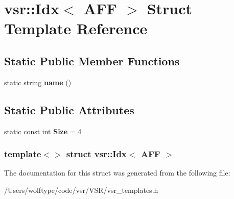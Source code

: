 \hypertarget{structvsr_1_1_idx_3_01_a_f_f_01_4}{\section{vsr\-:\-:Idx$<$ A\-F\-F $>$ Struct Template Reference}
\label{structvsr_1_1_idx_3_01_a_f_f_01_4}
}
\subsection*{Static Public Member Functions}
\begin{DoxyCompactItemize}
\item 
\hypertarget{structvsr_1_1_idx_3_01_a_f_f_01_4_a6efc931bd281e89a09f1e513e2a0b650}{static string {\bfseries name} ()}\label{structvsr_1_1_idx_3_01_a_f_f_01_4_a6efc931bd281e89a09f1e513e2a0b650}

\end{DoxyCompactItemize}
\subsection*{Static Public Attributes}
\begin{DoxyCompactItemize}
\item 
\hypertarget{structvsr_1_1_idx_3_01_a_f_f_01_4_af1a296dfb6c5f9397e5596579d8ed7e6}{static const int {\bfseries Size} = 4}\label{structvsr_1_1_idx_3_01_a_f_f_01_4_af1a296dfb6c5f9397e5596579d8ed7e6}

\end{DoxyCompactItemize}
\subsubsection*{template$<$$>$ struct vsr\-::\-Idx$<$ A\-F\-F $>$}



The documentation for this struct was generated from the following file\-:\begin{DoxyCompactItemize}
\item 
/\-Users/wolftype/code/vsr/\-V\-S\-R/vsr\-\_\-templates.\-h\end{DoxyCompactItemize}
